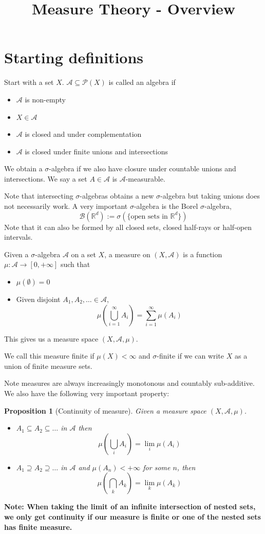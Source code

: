 \documentclass[11pt]{article}
\title{Measure Theory - Overview}
\author{}
\date{}
\newcommand{\defeq}{:=}
\newcommand{\msrspc}{\ensuremath{(X,\mathcal{A},\mu)}}
\newcommand{\sigal}{$\sigma$-algebra}
\newcommand{\pow}[1]{\mathcal{P}(#1)}
\newcommand{\R}{\mathbb{R}}
\newenvironment{defin}
	{\begin{mdframed}[backgroundcolor=white, roundcorner=5pt, linewidth=1pt]}
	{\end{mdframed}}
\newcommand{\mdf}[1]{{\color{red} #1}}
\newenvironment{note}
	{\begin{mdframed}[backgroundcolor=white, linecolor=red, roundcorner=5pt, linewidth=1pt]\bfseries{Note:}\normalfont}
	{\end{mdframed}}
\newtheorem{prop}[theorem]{Proposition}
\begin{document}
\maketitle
\section{Starting definitions}
\begin{defin}
Start with a set $X$.
$\mathcal{A}\subseteq\pow{X}$ is called an \mdf{algebra} if 
\begin{itemize}
	\item $\mathcal{A}$ is non-empty
	\item $X\in \mathcal{A}$
	\item $\mathcal{A}$ is closed and under complementation
	\item $\mathcal{A}$ is closed under finite unions and intersections
\end{itemize}
We obtain a \mdf{\sigal} if we also have closure under countable unions and intersections.
We say a set $A\in\mathcal{A}$ is \mdf{$\mathcal{A}$-measurable}.
\end{defin}
Note that intersecting {\sigal s} obtains a new {\sigal} but taking unions does not necessarily work.
A very important {\sigal} is the \mdf{Borel \sigal},
$$\mathcal{B}(\R^d)\defeq\sigma\left(\{\text{open sets in }\R^d\}\right)$$
Note that it can also be formed by all closed sets, closed half-rays or half-open intervals.
\begin{defin}
	Given a {\sigal} $\mathcal{A}$ on a set $X$, a \mdf{measure} on $(X,\mathcal{A})$ is a function $\mu:\mathcal{A}\to[0,+\infty]$ such that
	\begin{itemize}
		\item $\mu(\emptyset)=0$
		\item Given disjoint $A_1,A_2,\dots\in\mathcal{A}$,
			$$\mu\left(\bigcup_{i=1}^\infty A_i\right)=\sum_{i=1}^\infty \mu(A_i)$$
	\end{itemize}
	This gives us a \mdf{measure space} \msrspc.
	
	We call this measure \mdf{finite} if $\mu(X)<\infty$ and \mdf{$\sigma$-finite} if we can write $X$ as a union of finite measure sets.
\end{defin}
Note measures are always increasingly monotonous and countably sub-additive.
We also have the following very important property:
\begin{prop}[Continuity of measure]
	Given a measure space \msrspc.
	\begin{itemize}
		\item $A_1\subseteq A_2\subseteq \dots$ in $\mathcal{A}$ then
			$$\mu\left(\bigcup_i A_i\right)=\lim_i\mu(A_i)$$
		\item $A_1\supseteq A_2\supseteq \dots$ in $\mathcal{A}$ and $\mu(A_n) < +\infty$ for some $n$, then
			$$\mu\left(\bigcap_k A_k\right)=\lim_k \mu(A_k)$$
	\end{itemize}
\end{prop}
\begin{note}
	When taking the limit of an infinite intersection of nested sets, we only get continuity if our measure is finite or one of the nested sets has finite measure.
\end{note}
\end{document}
